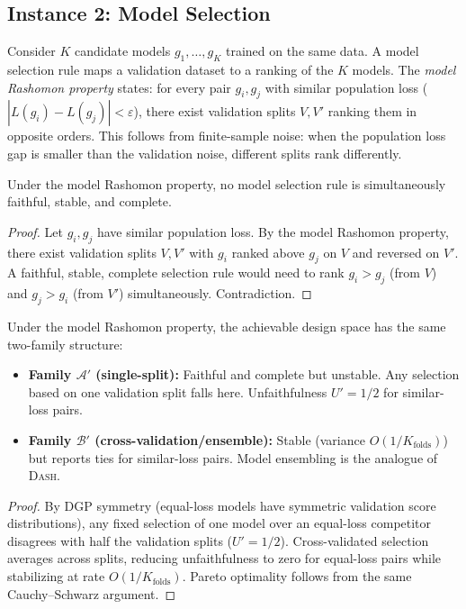 \documentclass{jmlr}
\newcommand{\DASH}{\textsc{Dash}}
\begin{document}
\subsection{Instance 2: Model Selection}

Consider $K$ candidate models $g_1, \ldots, g_K$ trained on the same data. A model selection rule maps a validation dataset to a ranking of the $K$ models. The \emph{model Rashomon property} states: for every pair $g_i, g_j$ with similar population loss ($|L(g_i) - L(g_j)| < \varepsilon$), there exist validation splits $V, V'$ ranking them in opposite orders. This follows from finite-sample noise: when the population loss gap is smaller than the validation noise, different splits rank differently.

\begin{theorem}
\label{thm:model-selection}
Under the model Rashomon property, no model selection rule is simultaneously faithful, stable, and complete.
\end{theorem}

\begin{proof}
Let $g_i, g_j$ have similar population loss. By the model Rashomon property, there exist validation splits $V, V'$ with $g_i$ ranked above $g_j$ on $V$ and reversed on $V'$. A faithful, stable, complete selection rule would need to rank $g_i > g_j$ (from $V$) and $g_j > g_i$ (from $V'$) simultaneously. Contradiction.
\end{proof}

\begin{theorem}
\label{thm:model-selection-ds}
Under the model Rashomon property, the achievable design space has the same two-family structure:
\begin{itemize}
    \item \textbf{Family $\mathcal{A}'$ (single-split):} Faithful and complete but unstable. Any selection based on one validation split falls here. Unfaithfulness $U' = 1/2$ for similar-loss pairs.
    \item \textbf{Family $\mathcal{B}'$ (cross-validation/ensemble):} Stable (variance $O(1/K_{\text{folds}})$) but reports ties for similar-loss pairs. Model ensembling is the analogue of \DASH{}.
\end{itemize}
\end{theorem}

\begin{proof}
By DGP symmetry (equal-loss models have symmetric validation score distributions), any fixed selection of one model over an equal-loss competitor disagrees with half the validation splits ($U' = 1/2$). Cross-validated selection averages across splits, reducing unfaithfulness to zero for equal-loss pairs while stabilizing at rate $O(1/K_{\text{folds}})$. Pareto optimality follows from the same Cauchy--Schwarz argument.
\end{proof}
\end{document}

